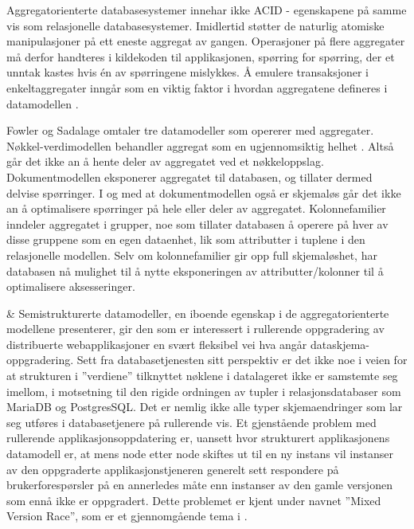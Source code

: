 Aggregatorienterte databasesystemer innehar ikke ACID - egenskapene på samme vis som relasjonelle databasesystemer. Imidlertid støtter de naturlig atomiske manipulasjoner på ett eneste aggregat av gangen. Operasjoner på flere aggregater må derfor handteres i kildekoden til applikasjonen, spørring for spørring, der et unntak kastes hvis én av spørringene mislykkes. Å emulere transaksjoner i enkeltaggregater inngår som en viktig faktor i hvordan aggregatene defineres i datamodellen \citep{sadalage2013}.

Fowler og Sadalage omtaler tre datamodeller som opererer med aggregater. Nøkkel-verdimodellen behandler aggregat som en ugjennomsiktig helhet \citep{sadalage2013}. Altså går det ikke an å hente deler av aggregatet ved et nøkkeloppslag. Dokumentmodellen eksponerer aggregatet til databasen, og tillater dermed delvise spørringer. I og med at dokumentmodellen også er skjemaløs går det ikke an å optimalisere spørringer på hele eller deler av aggregatet. Kolonnefamilier inndeler aggregatet i grupper, noe som tillater databasen å operere på hver av disse gruppene som en egen dataenhet, lik som attributter i tuplene i den relasjonelle modellen. Selv om kolonnefamilier gir opp full skjemaløshet, har databasen nå mulighet til å nytte eksponeringen av attributter/kolonner til å optimalisere aksesseringer.

& Semistrukturerte datamodeller, en iboende egenskap i de aggregatorienterte modellene \cite{sadalage2013} presenterer, gir den som er interessert i rullerende oppgradering av distribuerte webapplikasjoner en svært fleksibel vei hva angår dataskjema-oppgradering. Sett fra databasetjenesten sitt perspektiv er det ikke noe i veien for at strukturen i ''verdiene'' tilknyttet nøklene i datalageret ikke er samstemte seg imellom, i motsetning til den rigide ordningen av tupler i relasjonsdatabaser som MariaDB og PostgresSQL. Det er nemlig ikke alle typer skjemaendringer som lar seg utføres i databasetjenere på rullerende vis. Et gjenstående problem med rullerende applikasjonsoppdatering er, uansett hvor strukturert applikasjonens datamodell er, at mens node etter node skiftes ut til en ny instans vil instanser av den oppgraderte applikasjonstjeneren generelt sett respondere på brukerforespørsler på en annerledes måte enn instanser av den gamle versjonen som ennå ikke er oppgradert. Dette problemet er kjent under navnet ''Mixed Version Race'', som er et gjennomgående tema i \cite{dumitras2010upgrade,dumitracs2009upgrades}.

